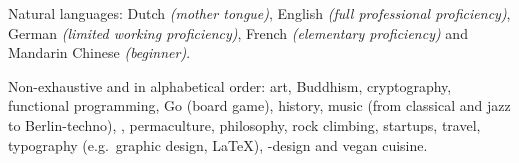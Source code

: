 \documentclass[10pt,a4paper]{article}
\begin{document}
\vspace{0.5em}
\inlineheadsection
  {Natural languages:}
  {Dutch \emph{(mother tongue)}, English \emph{(full professional proficiency)}, German \emph{(limited working proficiency)}, French \emph{(elementary proficiency)} and Mandarin Chinese \emph{(beginner)}.}


\spacedhrule{1.6em}{-0.4em}


\inlineheadsection
  {Non-exhaustive and in alphabetical order:}
  {art, Buddhism, cryptography, functional programming, Go (board game), history, music (from classical and jazz to Berlin-techno), , permaculture, philosophy, rock climbing, startups, travel, typography (e.g.\ graphic design, \LaTeX), -design and vegan cuisine.}
\end{document}
